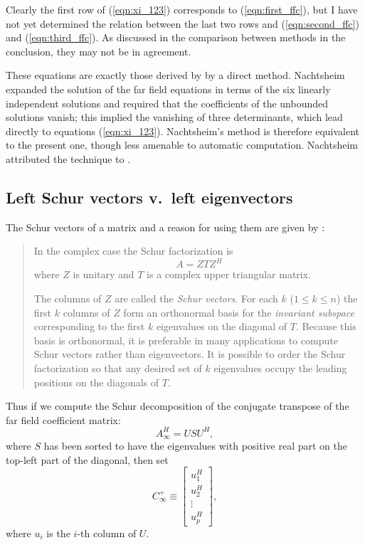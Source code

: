 \documentclass{article}
\begin{document}
Clearly the first row of (\ref{eqn:xi_123}) corresponds to
(\ref{eqn:first_ffc}), but I have not yet determined the relation
between the last two rows and (\ref{eqn:second_ffc}) and
(\ref{eqn:third_ffc}).  As discussed in the comparison between methods
in the conclusion, they may not be in agreement.

These equations are exactly those derived by
\citet[App.~C]{Nachtsheim63:SFC} by a direct method.  Nachtsheim
expanded the solution of the far field equations in terms of the six
linearly independent solutions and required that the coefficients of
the unbounded solutions vanish; this implied the vanishing of three
determinants, which lead directly to equations (\ref{eqn:xi_123}).
Nachtsheim's method is therefore equivalent to the present one, though
less amenable to automatic computation.  Nachtsheim attributed the
technique to \citet{Brown61:BLF-913}.

\subsection{Left Schur vectors v.\ left eigenvectors}

The Schur vectors of a matrix and a reason for using them are given by
\citet{Anderson99:LUG}:
\begin{quotation}
In the complex case the Schur factorization is
\begin{displaymath}
A=ZTZ^H
\end{displaymath}
where $Z$ is unitary and $T$ is a complex upper triangular matrix.

The columns of $Z$ are called the \emph{Schur vectors}.  For each $k$
($1\leq k\leq n$) the first $k$ columns of $Z$ form an orthonormal
basis for the \emph{invariant subspace} corresponding to the first $k$
eigenvalues on the diagonal of $T$.  Because this basis is
orthonormal, it is preferable in many applications to compute Schur
vectors rather than eigenvectors.  It is possible to order the Schur
factorization so that any desired set of $k$ eigenvalues occupy the
leading positions on the diagonals of $T$.
\end{quotation}

Thus if we compute the Schur decomposition of the conjugate transpose
of the far field coefficient matrix:
\begin{equation}
A_\infty^H = U S U^H,
\end{equation}
where $S$ has been sorted to have the eigenvalues with positive real
part on the top-left part of the diagonal, then set
\begin{equation}
C_\infty^+ \equiv \left[\begin{array}{c}
        u_1^H \\
        u_2^H \\
        \vdots \\
        u_p^H           \end{array}\right],
\end{equation}
where $u_i$ is the $i$-th column of $U$.  
\end{document}
